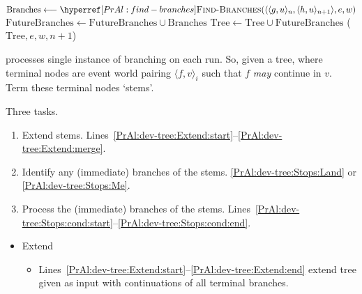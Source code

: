 \begin{note}
\begin{algorithm}[H]
{{        \label{PrAl:dev-tree:Stops:cond:else:futureB:start}
        {
          \label{PrAl:dev-tree:Stops:cond:else:futureB:loop:start}
          \(\text{Branches} \longleftarrow \AlgFindBranches{}(\langle \langle g,u \rangle_{n}, \langle h,u \rangle_{n+1}\rangle, e, w)\)\;
          \label{PrAl:dev-tree:Stops:cond:else:futureB:loop:getBranches}
          \(\text{FutureBranches} \longleftarrow \text{FutureBranches} \cup \text{Branches}\)\;
          \label{PrAl:dev-tree:Stops:cond:else:futureB:loop:gather}
        }
        \label{PrAl:dev-tree:Stops:cond:else:futureB:end}
        {
          \(\text{Tree} \longleftarrow \text{Tree} \cup \text{FutureBranches}\)\;
          \label{PrAl:dev-tree:Stops:cond:else:futureB:process:expand}
          \AlgDevelopTree{}(\(\text{Tree}, e,w, n+1\))\;
          \label{PrAl:dev-tree:Stops:cond:else:futureB:process:end}
        }
        \label{PrAl:dev-tree:Stops:cond:else:end}
      }
      \label{PrAl:dev-tree:Stops:cond:end}
    }
  \end{algorithm}

  \AlgDevelopTree{} processes single instance of branching on each run.
  So, given a tree, where terminal nodes are event world pairing \(\langle f,v \rangle_{i}\) such that \(f\) \emph{may} continue in \(v\).
  Term these terminal nodes `stems'.

  Three tasks.
  \begin{enumerate}
  \item
    Extend stems.%
    \hfill%
    Lines~\ref{PrAl:dev-tree:Extend:start}--\ref{PrAl:dev-tree:Extend:merge}.
  \item
    Identify any (immediate) branches of the stems.%
    \hfill%
    \autoref{PrAl:dev-tree:Stops:Land} or \autoref{PrAl:dev-tree:Stops:Me}.
  \item
    Process the (immediate) branches of the stems.%
    \hfill%
    Lines~\ref{PrAl:dev-tree:Stops:cond:start}--\ref{PrAl:dev-tree:Stops:cond:end}.
  \end{enumerate}

  \begin{itemize}
  \item
    Extend
    \begin{itemize}
    \item
      Lines~\ref{PrAl:dev-tree:Extend:start}--\ref{PrAl:dev-tree:Extend:end} extend tree given as input with continuations of all terminal branches.


\end{itemize}
\end{itemize}
\end{note}
